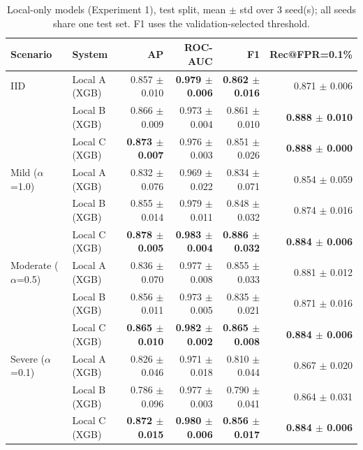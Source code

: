 \begin{table}[t]
\centering
\scriptsize
\caption{Local-only models (Experiment 1), test split, mean $\pm$ std over 3 seed(s); all seeds share one test set. F1 uses the validation-selected threshold.}
\label{tab:local}
\begin{tabular}{llrrrr}
\toprule
Scenario & System & AP & ROC-AUC & F1 & Rec@FPR=0.1\% \\
\midrule
IID & Local A (XGB) & 0.857 $\pm$ 0.010 & \textbf{0.979 $\pm$ 0.006} & \textbf{0.862 $\pm$ 0.016} & 0.871 $\pm$ 0.006 \\
 & Local B (XGB) & 0.866 $\pm$ 0.009 & 0.973 $\pm$ 0.004 & 0.861 $\pm$ 0.010 & \textbf{0.888 $\pm$ 0.010} \\
 & Local C (XGB) & \textbf{0.873 $\pm$ 0.007} & 0.976 $\pm$ 0.003 & 0.851 $\pm$ 0.026 & \textbf{0.888 $\pm$ 0.000} \\
\midrule
Mild ($\alpha$=1.0) & Local A (XGB) & 0.832 $\pm$ 0.076 & 0.969 $\pm$ 0.022 & 0.834 $\pm$ 0.071 & 0.854 $\pm$ 0.059 \\
 & Local B (XGB) & 0.855 $\pm$ 0.014 & 0.979 $\pm$ 0.011 & 0.848 $\pm$ 0.032 & 0.874 $\pm$ 0.016 \\
 & Local C (XGB) & \textbf{0.878 $\pm$ 0.005} & \textbf{0.983 $\pm$ 0.004} & \textbf{0.886 $\pm$ 0.032} & \textbf{0.884 $\pm$ 0.006} \\
\midrule
Moderate ($\alpha$=0.5) & Local A (XGB) & 0.836 $\pm$ 0.070 & 0.977 $\pm$ 0.008 & 0.855 $\pm$ 0.033 & 0.881 $\pm$ 0.012 \\
 & Local B (XGB) & 0.856 $\pm$ 0.011 & 0.973 $\pm$ 0.005 & 0.835 $\pm$ 0.021 & 0.871 $\pm$ 0.016 \\
 & Local C (XGB) & \textbf{0.865 $\pm$ 0.010} & \textbf{0.982 $\pm$ 0.002} & \textbf{0.865 $\pm$ 0.008} & \textbf{0.884 $\pm$ 0.006} \\
\midrule
Severe ($\alpha$=0.1) & Local A (XGB) & 0.826 $\pm$ 0.046 & 0.971 $\pm$ 0.018 & 0.810 $\pm$ 0.044 & 0.867 $\pm$ 0.020 \\
 & Local B (XGB) & 0.786 $\pm$ 0.096 & 0.977 $\pm$ 0.003 & 0.790 $\pm$ 0.041 & 0.864 $\pm$ 0.031 \\
 & Local C (XGB) & \textbf{0.872 $\pm$ 0.015} & \textbf{0.980 $\pm$ 0.006} & \textbf{0.856 $\pm$ 0.017} & \textbf{0.884 $\pm$ 0.006} \\
\bottomrule
\end{tabular}
\end{table}
